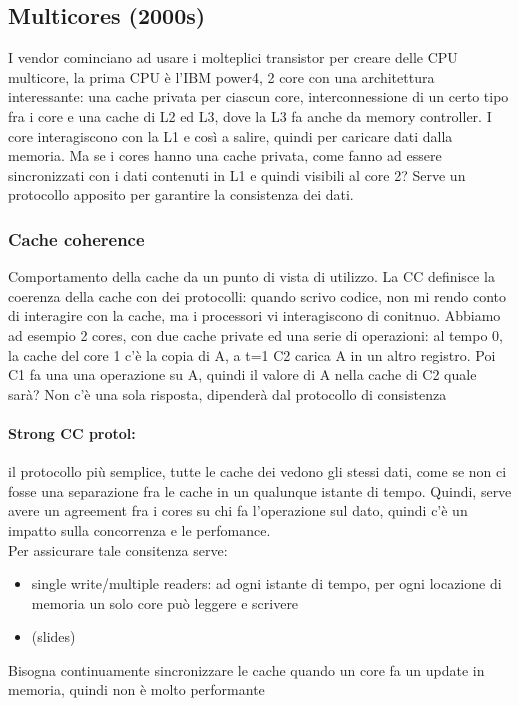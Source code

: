 \documentclass[12pt, oneside]{extbook} %
\begin{document}
\subsection{Multicores (2000s)}
I vendor cominciano ad usare i molteplici transistor per creare delle CPU multicore, la prima CPU è l'IBM power4, 2 core con una architettura interessante: una cache privata per ciascun core, interconnessione di un certo tipo fra i core e una cache di L2 ed L3, dove la L3 fa anche da memory controller. I core interagiscono con la L1 e così a salire, quindi per caricare dati dalla memoria. Ma se i cores hanno una cache privata, come fanno ad essere sincronizzati con i dati contenuti in L1 e quindi visibili al core 2? Serve un protocollo apposito per garantire la consistenza dei dati.

\subsubsection{Cache coherence}
Comportamento della cache da un punto di vista di utilizzo. La CC definisce la coerenza della cache con dei protocolli: quando scrivo codice, non mi rendo conto di interagire con la cache, ma i processori vi interagiscono di conitnuo. Abbiamo ad esempio 2 cores, con due cache private ed una serie di operazioni:
al tempo 0, la cache del core 1 c'è la copia di A, a t=1 C2 carica A in un altro registro. Poi C1 fa una una operazione su A, quindi il valore di A nella cache di C2 quale sarà? Non c'è una sola risposta, dipenderà dal protocollo di consistenza
\paragraph{Strong CC protol:}il protocollo più semplice, tutte le cache dei vedono gli stessi dati, come se non ci fosse una separazione fra le cache in un qualunque istante di tempo. Quindi, serve avere un agreement fra i cores su chi fa l'operazione sul dato, quindi c'è un impatto sulla concorrenza e le perfomance.\\ Per assicurare tale consitenza serve:
\begin{itemize}
\item single write/multiple readers: ad ogni istante di tempo, per ogni locazione di memoria un solo core può leggere e scrivere
\item (slides)
\end{itemize}
Bisogna continuamente sincronizzare le cache quando un core fa un update in memoria, quindi non è molto performante
\end{document}
